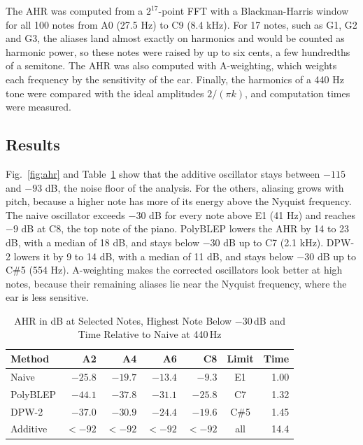 The AHR was computed from a $2^{17}$-point FFT with a Blackman-Harris
window for all 100 notes from A0 (27.5 Hz) to C9 (8.4 kHz). For 17 notes,
such as G1, G2 and G3, the aliases land almost exactly on harmonics and
would be counted as harmonic power, so these notes were raised by up to
six cents, a few hundredths of a semitone. The AHR was also computed
with A-weighting, which weights each frequency by the sensitivity of the
ear. Finally, the harmonics of a 440 Hz tone were compared with the ideal
amplitudes $2/(\pi k)$, and computation times were measured.

\subsection{Results}\label{sec:results}
Fig.~\ref{fig:ahr} and Table~\ref{tab:summary} show that the additive
oscillator stays between $-115$ and $-93$ dB, the noise floor of the
analysis. For the others, aliasing grows with pitch,
because a higher note has more of its energy above the Nyquist frequency.
The naive oscillator exceeds $-30$ dB for every note above E1 (41 Hz) and
reaches $-9$ dB at C8, the top note of the piano. PolyBLEP lowers the AHR
by 14 to 23 dB, with a median of 18 dB, and stays below $-30$ dB up to
C7 (2.1 kHz). DPW-2 lowers it by 9 to 14 dB, with a median of 11 dB, and
stays below $-30$ dB up to C\#5 (554 Hz).
A-weighting makes the corrected oscillators look better at high notes,
because their remaining aliases lie near the Nyquist frequency, where the
ear is less sensitive.

\begin{table}[!t]
  \caption{AHR in dB at Selected Notes, Highest Note Below $-30$\,dB and
  Time Relative to Naive at 440\,Hz}
  \label{tab:summary}
  \centering
  \setlength{\tabcolsep}{4pt}
  \begin{tabular}{lrrrrcr}
    \toprule
    Method & A2 & A4 & A6 & C8 & Limit & Time \\
    \midrule
    Naive    & $-25.8$ & $-19.7$ & $-13.4$ & $-9.3$  & E1   & 1.00 \\
    PolyBLEP & $-44.1$ & $-37.8$ & $-31.1$ & $-25.8$ & C7   & 1.32 \\
    DPW-2    & $-37.0$ & $-30.9$ & $-24.4$ & $-19.6$ & C\#5 & 1.45 \\
    Additive & $<-92$  & $<-92$  & $<-92$  & $<-92$  & all  & 14.4 \\
    \bottomrule
  \end{tabular}
\end{table}

